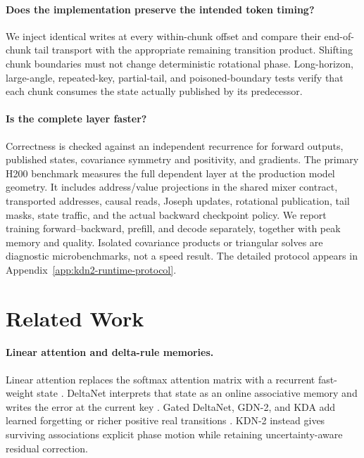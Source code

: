 \documentclass[11pt,letterpaper,logo]{yalearxiv}
\begin{document}
\paragraph{Does the implementation preserve the intended token timing?}
We inject identical writes at every within-chunk offset and compare their end-of-chunk tail
transport with the appropriate remaining transition product. Shifting chunk boundaries must not
change deterministic rotational phase. Long-horizon, large-angle, repeated-key, partial-tail, and
poisoned-boundary tests verify that each chunk consumes the state actually published by its
predecessor.

\paragraph{Is the complete layer faster?}
Correctness is checked against an independent recurrence for forward outputs, published states,
covariance symmetry and positivity, and gradients. The primary H200 benchmark measures the full
dependent layer at the production model geometry. It includes address/value projections in the
shared mixer contract, transported addresses, causal reads, Joseph updates, rotational
publication, tail masks, state traffic, and the actual backward checkpoint policy. We report
training forward--backward, prefill, and decode separately, together with peak memory and
quality. Isolated covariance products or triangular solves are diagnostic microbenchmarks, not a
speed result. The detailed protocol appears in Appendix~\ref{app:kdn2-runtime-protocol}.


\section{Related Work}
\label{sec:kdn2-related-work}

\paragraph{Linear attention and delta-rule memories.}
Linear attention replaces the softmax attention matrix with a recurrent fast-weight state
\citep{katharopoulos2020transformers}. DeltaNet interprets that state as an online associative
memory and writes the error at the current key
\citep{schlag2021linear,yang2024parallelizing}. Gated DeltaNet, GDN-2, and KDA add learned
forgetting or richer positive real transitions
\citep{yang2024gdn,hatamizadeh2026gdn2,kimiteam2025kimilinear}. KDN-2 instead gives surviving
associations explicit phase motion while retaining uncertainty-aware residual correction.
\end{document}
